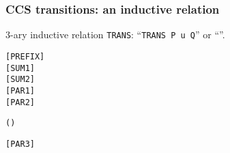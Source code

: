 \begin{frame}[fragile]
\frametitle{CCS transitions: an inductive relation}
3-ary inductive relation \texttt{TRANS}: ``\texttt{TRANS P u Q}'' or ``''.
\begin{small}
\begin{alltt}
\HOLTokenTurnstile{}  \HOLTokenTransBegin{}\HOLTokenTransEnd {}\hfill\texttt{[PREFIX]}
\HOLTokenTurnstile{}  \HOLTokenTransBegin{}\HOLTokenTransEnd {} \HOLSymConst{\HOLTokenImp{}}  \HOLSymConst{\ensuremath{+}}  \HOLTokenTransBegin{}\HOLTokenTransEnd {}\hfill\texttt{[SUM1]}
\HOLTokenTurnstile{}  \HOLTokenTransBegin{}\HOLTokenTransEnd {} \HOLSymConst{\HOLTokenImp{}}  \HOLSymConst{\ensuremath{+}}  \HOLTokenTransBegin{}\HOLTokenTransEnd {}\hfill\texttt{[SUM2]}
\HOLTokenTurnstile{}  \HOLTokenTransBegin{}\HOLTokenTransEnd {} \HOLSymConst{\HOLTokenImp{}}  \HOLSymConst{\ensuremath{\parallel}}  \HOLTokenTransBegin{}\HOLTokenTransEnd {} \HOLSymConst{\ensuremath{\parallel}} \hfill\texttt{[PAR1]}
\HOLTokenTurnstile{}  \HOLTokenTransBegin{}\HOLTokenTransEnd {} \HOLSymConst{\HOLTokenImp{}}  \HOLSymConst{\ensuremath{\parallel}}  \HOLTokenTransBegin{}\HOLTokenTransEnd {} \HOLSymConst{\ensuremath{\parallel}} \hfill\texttt{[PAR2]}
\end{alltt}
\end{small}
\begin{scriptsize}
\begin{alltt}
\HOLTokenTurnstile{}  \HOLTokenTransBegin{} \HOLTokenTransEnd {} \HOLSymConst{\HOLTokenConj{}}  \HOLTokenTransBegin{} ( )\HOLTokenTransEnd {} \HOLSymConst{\HOLTokenImp{}}  \HOLSymConst{\ensuremath{\parallel}}  \HOLTokenTransBegin\HOLSymConst{\ensuremath{\tau}}\HOLTokenTransEnd {} \HOLSymConst{\ensuremath{\parallel}} \hfill\begin{small}\texttt{[PAR3]}\end{small}


\end{alltt}
\end{scriptsize}
\end{frame}
